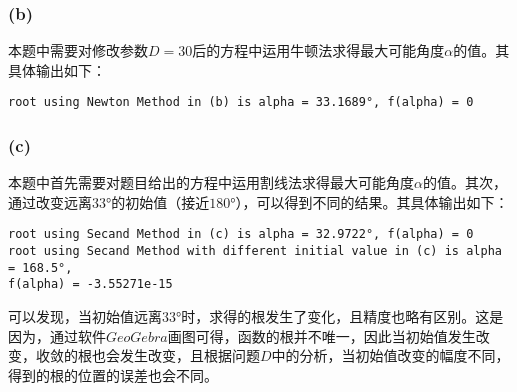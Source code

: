 \documentclass{ctexart}
\begin{document}
\begin{sloppypar}
\subsubsection*{(b)}
本题中需要对修改参数$D=30$后的方程中运用牛顿法求得最大可能角度$\alpha$的值。其具体输出如下：
\begin{shaded}
\begin{verbatim}
root using Newton Method in (b) is alpha = 33.1689°, f(alpha) = 0
\end{verbatim}
\end{shaded}
\subsubsection*{(c)}
本题中首先需要对题目给出的方程中运用割线法求得最大可能角度$\alpha$的值。其次，通过改变远离$33°$的初始值（接近$180°$），可以得到不同的结果。其具体输出如下：
\begin{shaded}
\begin{verbatim}
root using Secand Method in (c) is alpha = 32.9722°, f(alpha) = 0
root using Secand Method with different initial value in (c) is alpha = 168.5°, 
f(alpha) = -3.55271e-15
\end{verbatim}
\end{shaded}
可以发现，当初始值远离$33°$时，求得的根发生了变化，且精度也略有区别。这是因为，通过软件$GeoGebra$画图可得，函数的根并不唯一，因此当初始值发生改变，收敛的根也会发生改变，且根据问题$D$中的分析，当初始值改变的幅度不同，得到的根的位置的误差也会不同。

\end{sloppypar}
\end{document}
